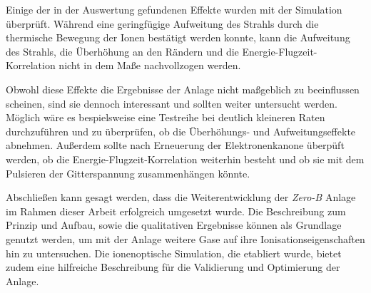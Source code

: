Einige der in der Auswertung gefundenen Effekte wurden mit der Simulation überprüft. Während eine geringfügige Aufweitung des Strahls durch die thermische Bewegung der Ionen bestätigt werden konnte, kann die Aufweitung des Strahls, die Überhöhung an den Rändern und die Energie-Flugzeit-Korrelation nicht in dem Maße nachvollzogen werden.

Obwohl diese Effekte die Ergebnisse der Anlage nicht maßgeblich zu beeinflussen scheinen, sind sie dennoch interessant und sollten weiter untersucht werden. Möglich wäre es bespielsweise eine Testreihe bei deutlich kleineren Raten durchzuführen und zu überprüfen, ob die Überhöhungs- und Aufweitungseffekte abnehmen. Außerdem sollte nach Erneuerung der Elektronenkanone überpüft werden, ob die Energie-Flugzeit-Korrelation weiterhin besteht und ob sie mit dem Pulsieren der Gitterspannung zusammenhängen könnte.

Abschließen kann gesagt werden, dass die Weiterentwicklung der \textit{Zero-B} Anlage im Rahmen dieser Arbeit erfolgreich umgesetzt wurde. Die Beschreibung zum Prinzip und Aufbau, sowie die qualitativen Ergebnisse können als Grundlage genutzt werden, um mit der Anlage weitere Gase auf ihre Ionisationseigenschaften hin zu untersuchen. Die ionenoptische Simulation, die etabliert wurde, bietet zudem eine hilfreiche Beschreibung für die Validierung und Optimierung der Anlage. 
